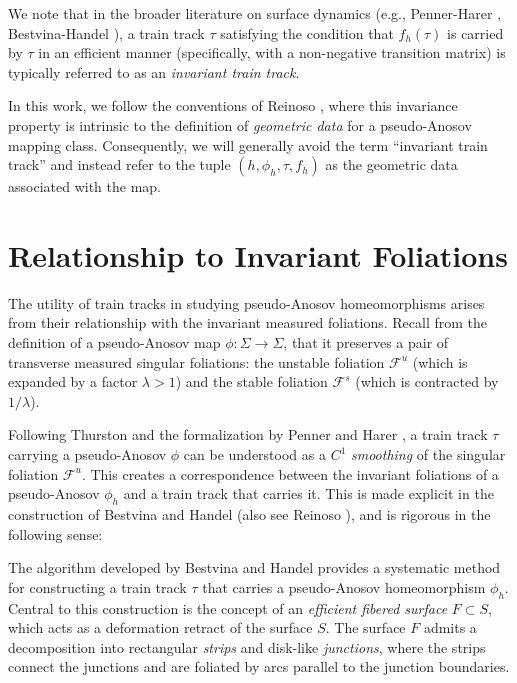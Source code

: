 \begin{remark}
    We note that in the broader literature on surface dynamics (e.g., Penner-Harer \cite{penner1992combinatorics}, Bestvina-Handel \cite{bestvina1995train}), a train track $\tau$ satisfying the condition that $f_h(\tau)$ is carried by $\tau$ in an efficient manner (specifically, with a non-negative transition matrix) is typically referred to as an \textit{invariant train track}.

    In this work, we follow the conventions of Reinoso \cite{reinoso2024pseudo}, where this invariance property is intrinsic to the definition of \textit{geometric data} for a pseudo-Anosov mapping class. Consequently, we will generally avoid the term ``invariant train track'' and instead refer to the tuple $(h, \phi_h, \tau, f_h)$ as the geometric data associated with the map.
\end{remark}


\section{Relationship to Invariant Foliations}
\label{sec:train track and foliations}

The utility of train tracks in studying pseudo-Anosov homeomorphisms arises from their relationship with the invariant measured foliations. Recall from the definition of a pseudo-Anosov map $\phi \colon \Sigma \to \Sigma$, that it preserves a pair of transverse measured singular foliations: the unstable foliation $\mathcal{F}^u$ (which is expanded by a factor $\lambda > 1$) and the stable foliation $\mathcal{F}^s$ (which is contracted by $1/\lambda$).

Following Thurston \cite{Thurston1988} and the formalization by Penner and Harer \cite{penner1992combinatorics}, a train track $\tau$ carrying a pseudo-Anosov $\phi$ can be understood as a $C^1$ \textit{smoothing} of the singular foliation $\mathcal{F}^u$. This creates a correspondence between the invariant foliations of a pseudo-Anosov $\phi_h$ and a train track that carries it. This is made explicit in the construction of Bestvina and Handel \cite{bestvina1995train} (also see Reinoso \cite{reinoso2024pseudo}), and is rigorous in the following sense:

The algorithm developed by Bestvina and Handel provides a systematic method for constructing a train track $\tau$ that carries a pseudo-Anosov homeomorphism $\phi_h$. Central to this construction is the concept of an \emph{efficient fibered surface} $F \subset S$, which acts as a deformation retract of the surface $S$. The surface $F$ admits a decomposition into rectangular \emph{strips} and disk-like \emph{junctions}, where the strips connect the junctions and are foliated by arcs parallel to the junction boundaries.

